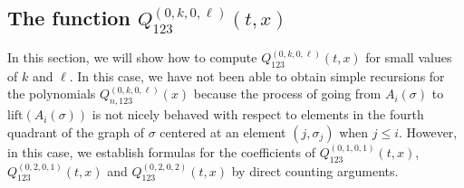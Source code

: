 \documentclass[
final,nomarks
]{dmtcs-episciences}
\newcommand{\lift}{\mathrm{lift}}
\newcommand{\Qm}[1]{Q_{123}^{(#1)}(t,x)}
\newcommand{\Qmn}[2]{Q_{#2,123}^{(#1)}(x)}
\begin{document}
\subsection{The function \(\Qm{0,k,0,\ell}\)}
In this section, we will show how to compute \begin{math}\Qm{0,k,0,\ell}\end{math} for small values 
of \begin{math}k\end{math} and \begin{math}\ell\end{math}.  In this case, we have not been able to 
obtain simple recursions for the polynomials \begin{math}\Qmn{0,k,0,\ell}{n}\end{math} because the process of 
going from \begin{math}A_i(\sigma)\end{math} to \begin{math}\lift(A_i(\sigma))\end{math} is not nicely behaved with respect 
to elements in the fourth quadrant of the graph of \begin{math}\sigma\end{math} centered at an 
element \begin{math}(j,\sigma_j)\end{math} when \begin{math}j \leq i\end{math}. However, in this case, we establish formulas 
for the coefficients of  \begin{math}\Qm{0,1,0,1}\end{math}, \begin{math}\Qm{0,2,0,1}\end{math} and \begin{math}\Qm{0,2,0,2}\end{math} by direct 
counting arguments. 
\end{document}

